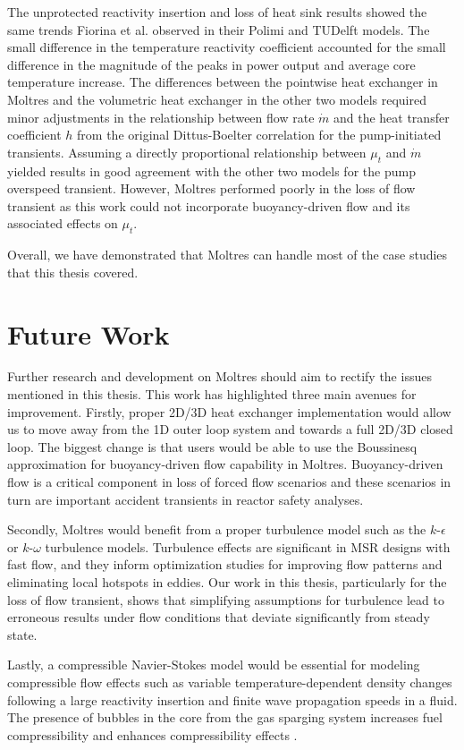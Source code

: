 The unprotected reactivity insertion and loss of heat sink results showed the
same trends Fiorina et al. observed in their Polimi and TUDelft models. The
small difference in the temperature reactivity coefficient accounted for the
small difference in the magnitude of the peaks in power output and average
core temperature increase. The differences between the pointwise heat
exchanger in Moltres and the volumetric heat exchanger in the other two
models required minor adjustments in the relationship between flow rate
$\dot{m}$ and the heat transfer coefficient $h$ from the original
Dittus-Boelter correlation for the pump-initiated transients. Assuming a
directly proportional relationship between $\mu_t$ and $\dot{m}$ yielded
results in good agreement with the other two models for the pump overspeed
transient. However, Moltres performed poorly in the loss of flow transient as
this work could not incorporate buoyancy-driven flow and its associated
effects on $\mu_t$.

Overall, we have demonstrated that Moltres can handle most of the case
studies that this thesis covered.

\section{Future Work}

Further research and development on Moltres should aim to rectify the issues
mentioned in this thesis. This work has highlighted three main avenues for
improvement. Firstly, proper 2D/3D heat exchanger implementation
would allow us to move away from the 1D outer loop system and towards a full
2D/3D closed loop. The biggest change is that users would be able to use
the Boussinesq approximation for buoyancy-driven flow capability in Moltres.
Buoyancy-driven flow is a critical component in loss of forced flow scenarios
and these scenarios in turn are important accident transients in reactor
safety analyses.

Secondly, Moltres would benefit from a proper turbulence model such as the
$k$-$\epsilon$ or $k$-$\omega$ turbulence models. Turbulence effects are
significant in \gls{MSR} designs with fast flow, and they inform optimization
studies for improving flow patterns and eliminating local hotspots in eddies.
Our work in this thesis, particularly for the loss of flow transient, shows
that simplifying assumptions for turbulence lead to erroneous results under
flow conditions that deviate significantly from steady state.

Lastly, a compressible Navier-Stokes model would be essential for modeling
compressible flow effects such as variable temperature-dependent density
changes following a large reactivity insertion and finite wave propagation
speeds in a fluid. The presence of bubbles in the core from the gas sparging
system increases fuel compressibility and enhances compressibility effects
\cite{cervi_development_2019}. 
